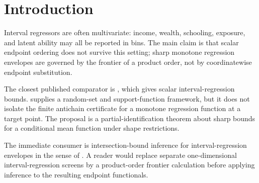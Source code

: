 \documentclass[11pt]{article}
\theoremstyle{definition}
\theoremstyle{plain}
\theoremstyle{remark}
\begin{document}
\section{Introduction}
Interval regressors are often multivariate: income, wealth, schooling, exposure, and latent ability may all be reported in bins.  The main claim is that scalar endpoint ordering does not survive this setting; sharp monotone regression envelopes are governed by the frontier of a product order, not by coordinatewise endpoint substitution.

The closest published comparator is \citet[Sec. 2, p. 330, abstract: ``interval data are available on one variable'']{ManskiTamer2002IntervalRegression}, which gives scalar interval-regression bounds.  \citet[Sec. 3, p. 1249, abstract: ``best linear predictions with interval outcome and covariate data'']{BeresteanuMolchanovMolinari2011ConvexMomentPredictions} supplies a random-set and support-function framework, but it does not isolate the finite antichain certificate for a monotone regression function at a target point.  The proposal is a partial-identification theorem about sharp bounds for a conditional mean function under shape restrictions.

The immediate consumer is intersection-bound inference for interval-regression envelopes in the sense of \citet[Sec. 1, p. 667, abstract: ``Intersection bounds are determined by the extrema of a collection of bounding functions'']{ChernozhukovLeeRosen2013IntersectionBounds}.  A reader would replace separate one-dimensional interval-regression screens by a product-order frontier calculation before applying inference to the resulting endpoint functionals.
\end{document}
